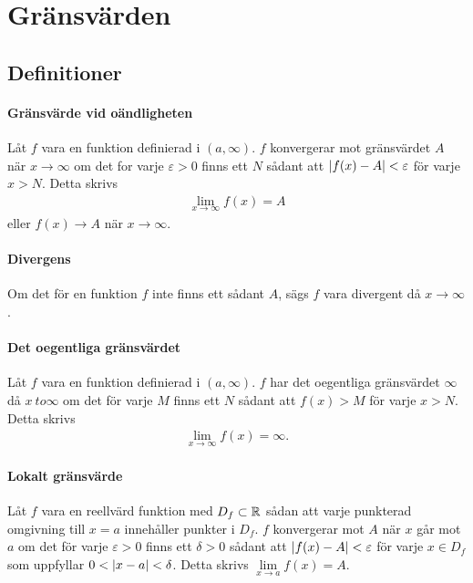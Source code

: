 \section{Gränsvärden}

\subsection{Definitioner}

\paragraph{Gränsvärde vid oändligheten}
Låt $f$ vara en funktion definierad i $(a, \infty)$. $f$ konvergerar mot gränsvärdet $A$ när $x\to\infty$ om det for varje $\varepsilon > 0$ finns ett $N$ sådant att $\abs{f(x) - A} < \varepsilon$ för varje $x > N$. Detta skrivs
\begin{align*}
	\lim_{x \to \infty} f(x) = A
\end{align*}
eller $f(x) \to A$ när $x \to \infty$.

\paragraph{Divergens}
Om det för en funktion $f$ inte finns ett sådant $A$, sägs $f$ vara divergent då $x\to\infty$.

\paragraph{Det oegentliga gränsvärdet}
Låt $f$ vara en funktion definierad i $(a, \infty)$. $f$ har det oegentliga gränsvärdet $\infty$ då $x \ to \infty$ om det för varje $M$ finns ett $N$ sådant att $f(x) > M$ för varje $x > N$. Detta skrivs
\begin{align*}
	\lim_{x \to \infty} f(x) = \infty.
\end{align*}

\paragraph{Lokalt gränsvärde}
Låt $f$ vara en reellvärd funktion med $D_f\subset\mathbb{R}$ sådan att varje punkterad omgivning till $x = a$ innehåller punkter i $D_f$. $f$ konvergerar mot $A$ när $x$ går mot $a$ om det för varje $\varepsilon > 0$ finns ett $\delta > 0$ sådant att $\abs{f(x) - A} < \varepsilon$ för varje $x\in D_f$ som uppfyllar $0 < \abs{x - a} < \delta$. Detta skrivs $\lim\limits_{x\to a} f(x) = A$.


